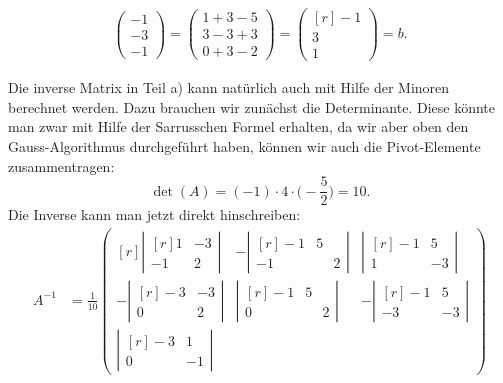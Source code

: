 \begin{loesung}
\begin{teilaufgaben}
\begin{align*}
\begin{pmatrix}
-1\\-3\\-1
\end{pmatrix}
=
\begin{pmatrix}
1+3-5\\
3-3+3\\
0+3-2
\end{pmatrix}
=
\begin{pmatrix*}[r]
-1\\3\\1
\end{pmatrix*}
=b.
\end{align*}
\end{teilaufgaben}
Die inverse Matrix in Teil a) kann natürlich auch mit Hilfe der
Minoren berechnet werden.
Dazu brauchen wir zunächst die Determinante.
Diese könnte man zwar mit
Hilfe der Sarrusschen Formel erhalten, da wir aber oben den Gauss-Algorithmus
durchgeführt haben, können wir auch die Pivot-Elemente zusammentragen:
\[
\det(A)
=
(-1)\cdot 4\cdot \biggl(-\frac52\biggr)
=
10.
\]
Die Inverse kann man jetzt direkt hinschreiben:
\begin{align*}
A^{-1}
&=
\frac1{10}
\begin{pmatrix*}[r]
 \left|\begin{matrix*}[r] 1&-3\\-1& 2\end{matrix*}\right|&
-\left|\begin{matrix*}[r]-1& 5\\-1&\phantom{-}2\end{matrix*}\right|&
 \left|\begin{matrix*}[r]-1& 5\\ 1&-3\end{matrix*}\right|\\[12pt]
-\left|\begin{matrix*}[r]-3&-3\\ 0& 2\end{matrix*}\right|&
 \left|\begin{matrix*}[r]-1& 5\\ 0&\phantom{-}2\end{matrix*}\right|&
-\left|\begin{matrix*}[r]-1& 5\\-3&-3\end{matrix*}\right|\\[12pt]
 \left|\begin{matrix*}[r]-3& 1\\ 0&-1\end{matrix*}\right|&

\end{pmatrix*}
\end{align*}
\end{loesung}
